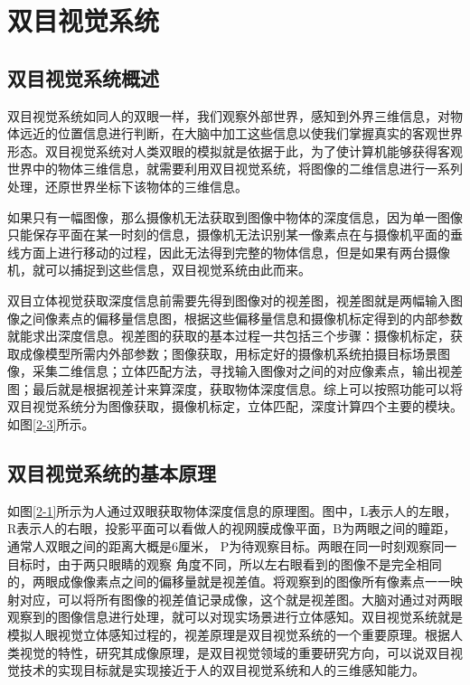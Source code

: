 
\chapter{双目视觉系统}

\section{双目视觉系统概述}
双目视觉系统如同人的双眼一样，我们观察外部世界，感知到外界三维信息，对物体远近的位置信息进行判断，在大脑中加工这些信息以使我们掌握真实的客观世界形态。双目视觉系统对人类双眼的模拟就是依据于此，为了使计算机能够获得客观世界中的物体三维信息，就需要利用双目视觉系统，将图像的二维信息进行一系列处理，还原世界坐标下该物体的三维信息。

如果只有一幅图像，那么摄像机无法获取到图像中物体的深度信息，因为单一图像只能保存平面在某一时刻的信息，摄像机无法识别某一像素点在与摄像机平面的垂线方面上进行移动的过程，因此无法得到完整的物体信息，但是如果有两台摄像机，就可以捕捉到这些信息，双目视觉系统由此而来。

双目立体视觉获取深度信息前需要先得到图像对的视差图，视差图就是两幅输入图像之间像素点的偏移量信息图，根据这些偏移量信息和摄像机标定得到的内部参数就能求出深度信息。视差图的获取的基本过程一共包括三个步骤：摄像机标定，获取成像模型所需内外部参数；图像获取，用标定好的摄像机系统拍摄目标场景图像，采集二维信息；立体匹配方法，寻找输入图像对之间的对应像素点，输出视差图；最后就是根据视差计来算深度，获取物体深度信息。综上可以按照功能可以将双目视觉系统分为图像获取，摄像机标定，立体匹配，深度计算四个主要的模块。如图\ref{2-3}所示。


\section{双目视觉系统的基本原理}

如图\ref{2-1}所示为人通过双眼获取物体深度信息的原理图。图中，L表示人的左眼，R表示人的右眼，投影平面可以看做人的视网膜成像平面，B为两眼之间的瞳距，通常人双眼之间的距离大概是6厘米，
P为待观察目标。两眼在同一时刻观察同一目标时，由于两只眼睛的观察
角度不同，所以左右眼看到的图像不是完全相同的，两眼成像像素点之间的偏移量就是视差值。将观察到的图像所有像素点一一映射对应，可以将所有图像的视差值记录成像，这个就是视差图。大脑对通过对两眼观察到的图像信息进行处理，就可以对现实场景进行立体感知。双目视觉系统就是模拟人眼视觉立体感知过程的，视差原理是双目视觉系统的一个重要原理。根据人类视觉的特性，研究其成像原理，是双目视觉领域的重要研究方向，可以说双目视觉技术的实现目标就是实现接近于人的双目视觉系统和人的三维感知能力。


